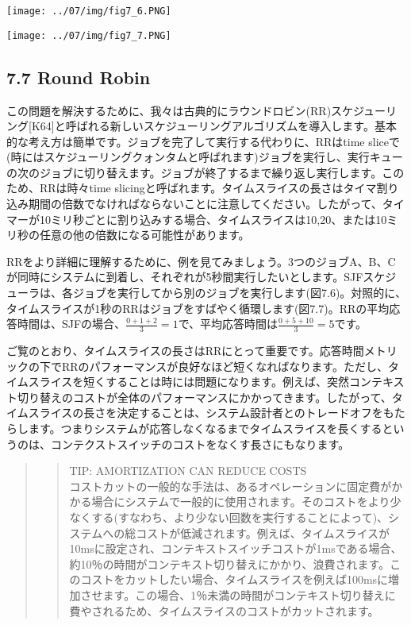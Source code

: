 \texttt{[image: ../07/img/fig7\_6.PNG]}

\texttt{[image: ../07/img/fig7\_7.PNG]}

\hypertarget{round-robin}{%
\subsection*{7.7 Round Robin}\label{round-robin}}

この問題を解決するために、我々は古典的にラウンドロビン(RR)スケジューリング{[}K64{]}と呼ばれる新しいスケジューリングアルゴリズムを導入します。基本的な考え方は簡単です。ジョブを完了して実行する代わりに、RRはtime
sliceで(時にはスケジューリングクォンタムと呼ばれます)ジョブを実行し、実行キューの次のジョブに切り替えます。ジョブが終了するまで繰り返し実行します。このため、RRは時々time
slicingと呼ばれます。タイムスライスの長さはタイマ割り込み期間の倍数でなければならないことに注意してください。したがって、タイマーが10ミリ秒ごとに割り込みする場合、タイムスライスは10,20、または10ミリ秒の任意の他の倍数になる可能性があります。

RRをより詳細に理解するために、例を見てみましょう。3つのジョブA、B、Cが同時にシステムに到着し、それぞれが5秒間実行したいとします。SJFスケジューラは、各ジョブを実行してから別のジョブを実行します(図7.6)。対照的に、タイムスライスが1秒のRRはジョブをすばやく循環します(図7.7)。RRの平均応答時間は、SJFの場合、\(\frac{0+1+2}{3} = 1\)で、平均応答時間は\(\frac{0+5+10}{3} = 5\)です。

ご覧のとおり、タイムスライスの長さはRRにとって重要です。応答時間メトリックの下でRRのパフォーマンスが良好なほど短くなればなります。ただし、タイムスライスを短くすることは時には問題になります。例えば、突然コンテキスト切り替えのコストが全体のパフォーマンスにかかってきます。したがって、タイムスライスの長さを決定することは、システム設計者とのトレードオフをもたらします。つまりシステムが応答しなくなるまでタイムスライスを長くするというのは、コンテクストスイッチのコストをなくす長さにもなります。

\begin{quote}
\begin{quote}
TIP: AMORTIZATION CAN REDUCE COSTS\\
コストカットの一般的な手法は、あるオペレーションに固定費がかかる場合にシステムで一般的に使用されます。そのコストをより少なくする(すなわち、より少ない回数を実行することによって)、システムへの総コストが低減されます。例えば、タイムスライスが10msに設定され、コンテキストスイッチコストが1msである場合、約10％の時間がコンテキスト切り替えにかかり、浪費されます。このコストをカットしたい場合、タイムスライスを例えば100msに増加させます。この場合、1％未満の時間がコンテキスト切り替えに費やされるため、タイムスライスのコストがカットされます。
\end{quote}
\end{quote}

